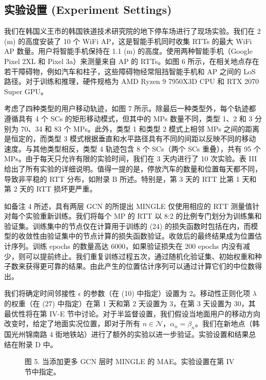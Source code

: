 \documentclass[journal]{IEEEtran}
\begin{document}
\subsection{实验设置 (Experiment Settings)}
我们在韩国义王市的韩国铁道技术研究院的地下停车场进行了现场实验。我们在 2 (m) 的高度安装了 10 个 WiFi AP，这是智能手机同时收集 RTTs 的最大 WiFi AP 数量。用户将智能手机保持在 1.1 (m) 的高度。使用两种智能手机（Google Pixel 2XL 和 Pixel 3a）来测量来自 AP 的 RTTs。如图 6 所示，在相关地点存在若干障碍物，例如汽车和柱子，这些障碍物经常阻挡智能手机和 AP 之间的 LoS 路径。对于训练和推理，硬件规格为 AMD Ryzen 9 7950X3D CPU 和 RTX 2070 Super GPU。

考虑了四种类型的用户移动轨迹，如图 7 所示。除最后一种类型外，每个轨迹都遵循具有 4 个 SCs 的矩形移动模式，但其中的 MPs 数量不同，类型 1、2 和 3 分别为 70、34 和 83 个 MPs。此外，类型 1 和类型 2 模式上相邻 MPs 之间的距离是恒定的，而类型 3 模式根据垂直和水平路径具有不同的间距以反映不同的移动速度。与其他类型相反，类型 4 轨迹包含 8 个 SCs（两个 SCs 重叠），共有 95 个 MPs。由于每天只允许有限的实验时间，我们在 3 天内进行了 10 次实验。表 III 给出了所有实验的详细说明。值得一提的是，停放汽车的数量和位置每天都不同，导致非平稳的 RTT 分布，如附录 B 所述。特别是，第 3 天的 RTT 比第 1 天和第 2 天的 RTT 损坏更严重。

如备注 4 所述，具有两层 GCN 的所提出 MINGLE 仅使用相应的 RTT 测量值针对每个实验重新训练。我们将每个 MP 的 RTT 以 8:2 的比例专门划分为训练集和验证集。训练集中的节点仅在计算用于训练的 (24) 的损失函数时包括在内，而模型的收敛性由验证集中的节点计算的损失函数验证。收敛后的最终结果成为位置估计序列。训练 epochs 的数量高达 6000，如果验证损失在 200 epochs 内没有减少，则可以提前终止。我们重复训练过程五次，通过随机化验证集、初始权重和种子数来获得更可靠的结果。由此产生的位置估计序列可以通过计算它们的中位数得出。

我们将确定时间邻接性 $\epsilon$ 的参数（在 (10) 中指定）设置为 2。移动性正则化项 $\lambda$ 的权重（在 (27) 中指定）在第 1 天和第 2 天设置为 3，在第 3 天设置为 30，其最优性将在第 IV-E 节中讨论。对于半监督设置，我们假设当地面用户的移动方向改变时，给定了地面实况位置，即对于所有 $n\in\mathcal{N}$，$\alpha_{n}=\beta_{n}$。我们在新地点（韩国光州锦南路 4 街地铁站）进行了额外的实验以进一步验证。实验设置和结果总结在附录 D 中。

\begin{figure}[htbp]
\centering
\caption{图 5. 当添加更多 GCN 层时 MINGLE 的 MAE。实验设置在第 IV 节中指定。}
\label{fig:5}
\end{figure}
\end{document}
